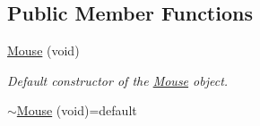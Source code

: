 \subsection*{Public Member Functions}
\begin{DoxyCompactItemize}
\item 
\hyperlink{classsparky_1_1_mouse_ae4d9c6a668bff6078e538ba79ebd2a56}{Mouse} (void)
\begin{DoxyCompactList}\small\item\em Default constructor of the \hyperlink{classsparky_1_1_mouse}{Mouse} object. \end{DoxyCompactList}\item 
\hyperlink{classsparky_1_1_mouse_a586c420b857867aca1c3d7f4cfee7b9f}{$\sim$\+Mouse} (void)=default\hypertarget{classsparky_1_1_mouse_a586c420b857867aca1c3d7f4cfee7b9f}{}\label{classsparky_1_1_mouse_a586c420b857867aca1c3d7f4cfee7b9f}


\end{DoxyCompactItemize}
